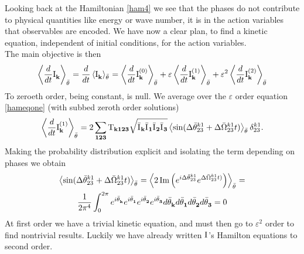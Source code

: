 Looking back at the Hamiltonian \eqref{ham4} we see that the phases do not contribute to physical quantities like energy or wave number, 
it is in the action variables that observables are encoded. We have now a clear plan, to find a kinetic equation, independent of initial conditions, for
the action variables. \\
The main objective is then
\begin{equation}
    \left\langle \frac{d}{dt} \mathrm{I}^{}_\mathbf{k} \right\rangle_{\bar{\theta}^{}} = \frac{d}{dt} \left\langle \mathrm{I}^{}_\mathbf{k} \right\rangle_{\bar{\theta}^{}} = \left\langle \frac{d}{dt} \mathrm{I}^{(0)}_\mathbf{k} \right\rangle_{\bar{\theta}^{}}+
    \varepsilon\left\langle \frac{d}{dt} \mathrm{I}^{(1)}_\mathbf{k} \right\rangle_{\bar{\theta}^{}} + \varepsilon^2\left\langle \frac{d}{dt} \mathrm{I}^{(2)}_\mathbf{k} \right\rangle_{\bar{\theta}^{}} 
    \label{kineticexp}
\end{equation}
To zeroeth order, being constant, is null. We average over the $\varepsilon$ order equation \eqref{hameqone} (with subbed zeroth order solutions)
\begin{equation}
    \left\langle \frac{d}{dt} \mathrm{I}^{(1)}_\mathbf{k} \right\rangle_{\bar{\theta}^{}} = 2\sum_{\mathbf{123}} \mathrm{T}_{\mathbf{k123}} \sqrt{\bar{\mathrm{I}^{}}_\mathbf{k}\bar{\mathrm{I}^{}}_\mathbf{1}\bar{\mathrm{I}^{}}_\mathbf{2}\bar{\mathrm{I}^{}}_\mathbf{3}} \left\langle\sin(\Delta\bar{\theta}^{k1}_{23} +
    \Delta\bar{\Omega}^{k1}_{23}t)\right\rangle_{\bar{\theta}^{}}\delta^{k1}_{23}.
\end{equation}
Making the probability distribution explicit and isolating the term depending on phases we obtain
\begin{multline}
    \left\langle\sin(\Delta\bar{\theta}^{k1}_{23} + \Delta\bar{\Omega}^{k1}_{23}t)\right\rangle_{\bar{\theta}^{}} = 
    \left\langle 2 \operatorname{Im}\left(e^{i\Delta\bar{\theta}^{k1}_{23}}e^{\Delta\bar{\Omega}^{k1}_{23}t)} \right)   \right\rangle_{\bar{\theta}^{}} = \\
    \frac{1}{2\pi^4}\int_{0}^{2\pi}  e^{i\bar{\theta}^{}_\mathbf{k}}e^{i\bar{\theta}^{}_\mathbf{1}}e^{i\bar{\theta}^{}_\mathbf{2}}e^{i\bar{\theta}^{}_\mathbf{3}} d \bar{\theta}^{}_\mathbf{k} d \bar{\theta}^{}_\mathbf{1} d \bar{\theta}^{}_\mathbf{2} d \bar{\theta}^{}_\mathbf{3} = 0
\end{multline}
At first order we have a trivial kinetic equation, and must then go to $\varepsilon^2$ order to find nontrivial results. Luckily we have already written $\mathrm{I}^{}$'s 
Hamilton equations to second order. \\


